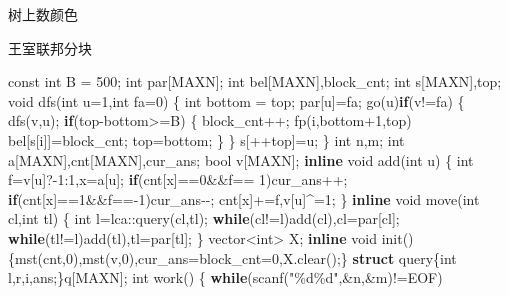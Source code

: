 \documentclass[
]{article}
\newenvironment{Shaded}{}{}
\newcommand{\AttributeTok}[1]{\textcolor[rgb]{0.49,0.56,0.16}{#1}}
\newcommand{\ControlFlowTok}[1]{\textcolor[rgb]{0.00,0.44,0.13}{\textbf{#1}}}
\newcommand{\DataTypeTok}[1]{\textcolor[rgb]{0.56,0.13,0.00}{#1}}
\newcommand{\DecValTok}[1]{\textcolor[rgb]{0.25,0.63,0.44}{#1}}
\newcommand{\KeywordTok}[1]{\textcolor[rgb]{0.00,0.44,0.13}{\textbf{#1}}}
\newcommand{\NormalTok}[1]{#1}
\newcommand{\SpecialCharTok}[1]{\textcolor[rgb]{0.25,0.44,0.63}{#1}}
\newcommand{\StringTok}[1]{\textcolor[rgb]{0.25,0.44,0.63}{#1}}
\begin{document}
树上数颜色

王室联邦分块

\begin{Shaded}
\begin{Highlighting}[]
\AttributeTok{const} \DataTypeTok{int}\NormalTok{ B = }\DecValTok{500}\NormalTok{;}
\DataTypeTok{int}\NormalTok{ par[MAXN];}
\DataTypeTok{int}\NormalTok{ bel[MAXN],block\_cnt;}
\DataTypeTok{int}\NormalTok{ s[MAXN],top;}
\DataTypeTok{void}\NormalTok{ dfs(}\DataTypeTok{int}\NormalTok{ u=}\DecValTok{1}\NormalTok{,}\DataTypeTok{int}\NormalTok{ fa=}\DecValTok{0}\NormalTok{)}
\NormalTok{\{}
    \DataTypeTok{int}\NormalTok{ bottom = top; par[u]=fa;}
\NormalTok{    go(u)}\ControlFlowTok{if}\NormalTok{(v!=fa)}
\NormalTok{    \{}
\NormalTok{        dfs(v,u);}
        \ControlFlowTok{if}\NormalTok{(top{-}bottom\textgreater{}=B)}
\NormalTok{        \{}
\NormalTok{            block\_cnt++;            }
\NormalTok{            fp(i,bottom+}\DecValTok{1}\NormalTok{,top)}
\NormalTok{                bel[s[i]]=block\_cnt;}
\NormalTok{            top=bottom;}
\NormalTok{        \}}
\NormalTok{    \}}
\NormalTok{    s[++top]=u;}
\NormalTok{\}}
\DataTypeTok{int}\NormalTok{ n,m;}
\DataTypeTok{int}\NormalTok{ a[MAXN],cnt[MAXN],cur\_ans;}
\DataTypeTok{bool}\NormalTok{ v[MAXN];}
\KeywordTok{inline} \DataTypeTok{void}\NormalTok{ add(}\DataTypeTok{int}\NormalTok{ u)}
\NormalTok{\{}
    \DataTypeTok{int}\NormalTok{ f=v[u]?{-}}\DecValTok{1}\NormalTok{:}\DecValTok{1}\NormalTok{,x=a[u];}
    \ControlFlowTok{if}\NormalTok{(cnt[x]==}\DecValTok{0}\NormalTok{\&\&f== }\DecValTok{1}\NormalTok{)cur\_ans++;}
    \ControlFlowTok{if}\NormalTok{(cnt[x]==}\DecValTok{1}\NormalTok{\&\&f=={-}}\DecValTok{1}\NormalTok{)cur\_ans{-}{-};}
\NormalTok{    cnt[x]+=f,v[u]\^{}=}\DecValTok{1}\NormalTok{;}
\NormalTok{\}}
\KeywordTok{inline} \DataTypeTok{void}\NormalTok{ move(}\DataTypeTok{int}\NormalTok{ cl,}\DataTypeTok{int}\NormalTok{ tl)}
\NormalTok{\{}
    \DataTypeTok{int}\NormalTok{ l=lca::query(cl,tl);}
    \ControlFlowTok{while}\NormalTok{(cl!=l)add(cl),cl=par[cl];}
    \ControlFlowTok{while}\NormalTok{(tl!=l)add(tl),tl=par[tl];}
\NormalTok{\}}
\NormalTok{vector\textless{}}\DataTypeTok{int}\NormalTok{\textgreater{} X;}
\KeywordTok{inline} \DataTypeTok{void}\NormalTok{ init()\{mst(cnt,}\DecValTok{0}\NormalTok{),mst(v,}\DecValTok{0}\NormalTok{),cur\_ans=block\_cnt=}\DecValTok{0}\NormalTok{,X.clear();\}}
\KeywordTok{struct}\NormalTok{ query\{}\DataTypeTok{int}\NormalTok{ l,r,i,ans;\}q[MAXN];}
\DataTypeTok{int}\NormalTok{ work()}
\NormalTok{\{}
    \ControlFlowTok{while}\NormalTok{(scanf(}\StringTok{"}\SpecialCharTok{\%d\%d}\StringTok{"}\NormalTok{,\&n,\&m)!=EOF)}

\end{Highlighting}
\end{Shaded}
\end{document}
